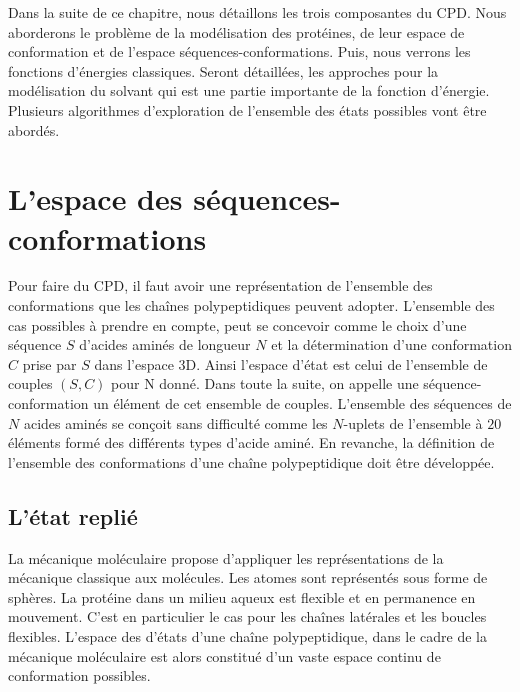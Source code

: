 Dans la suite de ce chapitre, nous détaillons les trois composantes du CPD. Nous aborderons le problème de la modélisation des protéines, de leur espace de conformation et de l'espace séquences-conformations. Puis, nous verrons les fonctions d'énergies classiques. Seront détaillées, les approches pour la modélisation du solvant qui est une partie importante de la fonction d'énergie. Plusieurs algorithmes d'exploration de l'ensemble des états possibles vont être abordés.  

\section{L'espace des séquences-conformations}
Pour faire du CPD, il faut avoir une représentation de l'ensemble des conformations que les chaînes polypeptidiques peuvent adopter. L'ensemble des cas possibles à prendre en compte, peut se concevoir comme le choix d'une séquence $S$ d'acides aminés de longueur $N$ et la détermination d'une conformation $C$ prise par $S$ dans l'espace 3D. Ainsi l'espace d'état est celui de l'ensemble de couples $(S,C)$ pour N donné. Dans toute la suite, on appelle une séquence-conformation un élément de cet ensemble de couples. L'ensemble des séquences de $N$ acides aminés se conçoit sans difficulté comme les $N$-uplets de l'ensemble à $20$ éléments formé des différents types d'acide aminé. En revanche, la définition de l'ensemble des conformations d'une chaîne polypeptidique doit être développée.

\subsection{L'état replié }
\label{sec:etatreplie}
La mécanique moléculaire propose d'appliquer les représentations de la mécanique classique aux molécules. Les atomes sont représentés sous forme de sphères. La protéine dans un milieu aqueux est flexible et en permanence en mouvement. C'est en particulier le cas pour les chaînes latérales et les boucles flexibles. L'espace des d'états d'une chaîne polypeptidique, dans le cadre de la mécanique moléculaire est alors constitué d'un vaste espace continu de conformation possibles.

